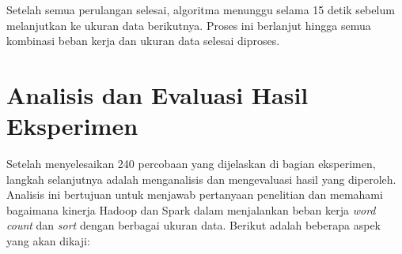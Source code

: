 Setelah semua perulangan selesai, algoritma menunggu selama 15 detik sebelum melanjutkan ke ukuran data berikutnya. Proses ini berlanjut hingga semua kombinasi beban kerja dan ukuran data selesai diproses.

\section{Analisis dan Evaluasi Hasil Eksperimen}

Setelah menyelesaikan 240 percobaan yang dijelaskan di bagian eksperimen, langkah selanjutnya adalah menganalisis dan mengevaluasi hasil yang diperoleh. Analisis ini bertujuan untuk menjawab pertanyaan penelitian dan memahami bagaimana kinerja Hadoop dan Spark dalam menjalankan beban kerja \textit{word count} dan \textit{sort} dengan berbagai ukuran data. Berikut adalah beberapa aspek yang akan dikaji:

